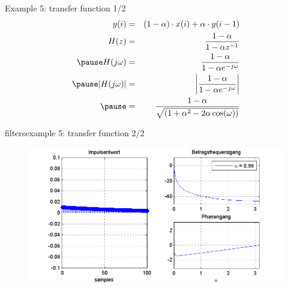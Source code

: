 	\begin{frame}{Example 5: transfer function 1/2}
    	\begin{eqnarray*}
        		y(i) &=& (1-\alpha)\cdot x(i) + \alpha\cdot y(i-1)\\
        		H(z) &=& \frac{1-\alpha}{1-\alpha z^{-1}}\\
        \pause
        		H(j\omega) &=& \frac{1-\alpha}{1-\alpha e^{-j\omega}}\\
        \pause
        		|H(j\omega)| &=& \left|\frac{1-\alpha}{1-\alpha e^{-j\omega}}\right| \\
        \pause
        		&=&\frac{1-\alpha}{\sqrt{\left(1 + \alpha^2 - 2\alpha\cos(\omega)\right)}} 
    	\end{eqnarray*}
	\end{frame}
	\begin{frame}{filters}{example 5: transfer function 2/2}
		\begin{figure}
			\centerline{\includegraphics[scale=.5]{graph/fx_05}}
		\end{figure}
	\end{frame}
